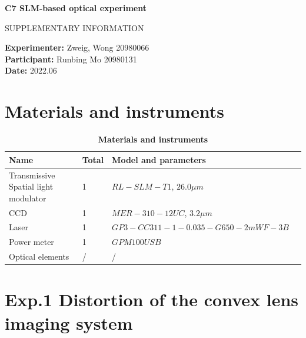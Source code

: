 \documentclass[12pt,a4paper,UTF8]{article}
\begin{document}

\begin{center}
\LARGE\textbf{C7 SLM-based optical experiment}

\vspace{0.5em}
\large{SUPPLEMENTARY INFORMATION}
\end{center}

\noindent
\textbf{Experimenter:} Zweig, Wong 20980066 \\
\textbf{Participant:} Runbing Mo 20980131 \\
\textbf{Date:} 2022.06


\tableofcontents
\newpage

\section{Materials and instruments}
\begin{table}[htbp]
    \centering
    \caption{\textbf{Materials and instruments}}
        \begin{tabular}{llll}
            \toprule
            Name &Total &Model and parameters \\
            \midrule
            Transmissive Spatial light modulator	&1	&$RL-SLM-T1$, $26.0\mu m$    \\    
            CCD	&1	&$MER-310-12UC$, $3.2 \mu m$    \\
            Laser	&1	&$GP3-CC311-1-0.035-G650-2mWF-3B$    \\  
            Power meter &1	&$GPM100USB$    \\
            Optical elements &/	&/    \\
            \bottomrule
        \end{tabular}
\end{table}	


\section{Exp.1 Distortion of the convex lens imaging system}
\end{document}
